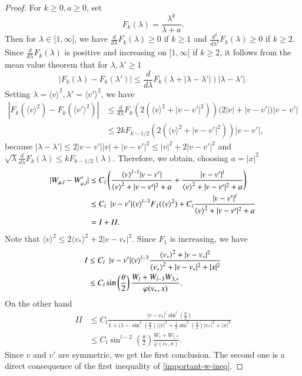 \documentclass{amsart}[12pt, article]
\begin{document}
\begin{proof} For $k \geq 0,  a \geq 0$, set
\[
F_k(\lambda)= \frac{\lambda^k}{\lambda + a}.
\]
Then for $\lambda \in [1,\infty[$, we have $\frac{d}{d\lambda}F_k(\lambda) \geq 0$ if $k \geq 1$
and $\frac{d^2}{d\lambda^2}F_k(\lambda) \geq 0$ if $k \geq 2$.
Since $\frac{d}{d\lambda}F_k(\lambda)$ is positive and increasing on
$[1,\infty[$ if $k \geq 2$, it follows {}from the mean
value theorem that for $\lambda, \lambda' \geq 1$
\[
|F_k(\lambda) -F_k(\lambda')| \leq \frac{d}{d\lambda}F_k (\lambda + |\lambda-\lambda'|) |\lambda-\lambda'|.
\]
Setting $\lambda = {{\langle}} v {{\rangle}}^2, \lambda' = {{\langle}} v' {{\rangle}}^2$, we have
\begin{align*}
|F_k({{\langle}} v {{\rangle}}^2) -F_k({{\langle}} v' {{\rangle}}^2)| &\leq
\frac{d}{d\lambda}F_k (2({{\langle}} v {{\rangle}}^2 + |v-v'|^2))\big( 2|v|+ |v-v'| \big )|v-v'|\\
&\leq 2k F_{k-1/2}(2({{\langle}} v {{\rangle}}^2 + |v-v'|^2))|v-v'|,
\end{align*}
because $ |\lambda-\lambda'| \leq 2|v-v'||v| + |v-v'|^2 \leq |v|^2 + 2 |v-v'|^2$
and $\sqrt \lambda \frac{d}{d\lambda}F_k(\lambda) \leq k F_{k-1/2}(\lambda)$.
Therefore, we obtain, choosing $a = |x|^2$
\begin{align}\label{important-w-ineq}
|W_{\varphi,l} - W_{\varphi,l} '| &\leq
C_l \left( \frac{{{\langle}} v {{\rangle}} ^{l-1}|v-v'|}
{{{\langle}} v {{\rangle}}^2 + |v-v'|^2 +a }
+ \frac{|v-v'|^l}
{{{\langle}} v {{\rangle}}^2 + |v-v'|^2 + a}\right) \notag \\
&\leq
C_l \enskip |v-v'| {{\langle}} v {{\rangle}}^{l-3} F_1({{\langle}} v {{\rangle}}^2)
+ C_l \frac{|v-v'|^l}
{{{\langle}} v {{\rangle}}^2 + |v-v'|^2 + a}\\
&= I + II. \notag
\end{align}
Note that ${{\langle}} v {{\rangle}}^2 \leq 2{{\langle}} v_* {{\rangle}}^2 + 2|v-v_*|^2$.
Since $F_1$ is increasing, we have
\begin{align*}
I &\leq C_l \enskip |v-v'| {{\langle}} v {{\rangle}}^{l-3} \frac{{{\langle}} v_* {{\rangle}}^2
+ |v-v_*|^2}{{{\langle}} v_* {{\rangle}}^2 + |v-v_*|^2+|x|^2}\\
&\leq C_l \sin \left(\frac{\theta}{2} \right)
\frac{W_l + W_{l-3}W_{3,*}}{\varphi(v_*,x)}.
\end{align*}
On the other hand
\begin{align*}
II &\leq C_l \frac{|v-v_*|^l  \sin^l\left(\frac{\theta}{2} \right)}
{1 + \big (1-\sin^2\left(\frac{\theta}{2} \right) \big )|v|^2 +
\frac{1}{2}\sin^2\left(\frac{\theta}{2} \right)|v_*|^2 +|x|^2} \\
&\leq C_l \sin^{l-2}\left(\frac{\theta}{2} \right)\frac{W_l + W_{l,*}}{\varphi(v_*,x)}.
\end{align*}
Since $v$ and $v'$ are symmetric, we get the first conclusion.
The second one is a direct consequence of the first inequality of \eqref{important-w-ineq}.
\end{proof}
\end{document}
